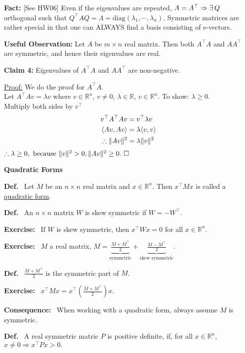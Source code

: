 \documentclass[letterpaper]{article}
\newcommand{\real}{\mathbb R}  %
\begin{document}
\noindent \textbf{Fact:} [See HW06] Even if the eigenvalues are repeated, $A=A^\top \Rightarrow \\ \exists\, Q$ orthogonal such that $Q^\top AQ=\Lambda=\mathrm{diag}(\lambda_1,\dotsb ,\lambda_n)$. Symmetric matrices are rather special in that one can ALWAYS find a basis consisting of e-vectors.

\textbf{Useful Observation:} Let $A$ be $m \times n$ real matrix. Then both $A^\top A$ and $AA^\top $ are symmetric, and hence their eigenvalues are real.

\textbf{Claim 4:} Eigenvalues of $A^\top A$ and $AA^\top $ are non-negative.

\underline{Proof:} We do the proof for $A^\top A$.\\
    Let $A^\top Av=\lambda v$ where $v\in \real^n$, $v \neq 0$, $\lambda \in \real$, $v\in\real^n$. To show: $\lambda \geq 0$.\\
    Multiply both sides by $v^\top $
    \begin{align*}
        v^\top A^\top Av &= v^\top\lambda v\\
        \langle Av, Av \rangle &=\lambda \langle v,v \rangle\\
        \therefore \Arrowvert Av \Arrowvert^2 &= \lambda \Arrowvert v \Arrowvert ^2
    \end{align*}
    $\therefore \lambda \geq 0,~\text{because}~\Arrowvert v \Arrowvert^2 > 0, \Arrowvert Av \Arrowvert^2 \geq 0.\ \square$

\newpage

\begin{center}\textbf{Quadratic Forms}\end{center}

\textbf{Def.}~ Let $M$ be an $n \times n$ real matrix and $x \in \real^n.$ Then $x^\top Mx$ is called a \underline{quadratic form}.

\textbf{Def.}~ An $n \times n$ matrix $W$ is skew symmetric if $W=-W^\top$.

\textbf{Exercise:}~ If $W$ is skew symmetric, then $x^\top Wx=0$ for all $x \in \real^n$.

\textbf{Exercise:}~ $M$ a real matrix, $M=\underbrace{\frac{M+M^\top }{2}}_\text{symmetric}+\underbrace{\frac{M-M^\top }{2}}_\text{skew symmetric}$.

\textbf{Def.}~ $\frac{M+M^\top }{2}$ is the symmetric part of $M$.

\textbf{Exercise:}~ $x^\top Mx=x^\top \left(\frac{M+M^\top }{2} \right)x$.

\textbf{Consequence:}~ When working with a quadratic form, always assume $M$ is symmetric.

\textbf{Def.}~ A real symmetric matric $P$ is positive definite, if, for all $x \in \real^n$, $x\neq 0 \Rightarrow x^\top Px>0.$
\end{document}
